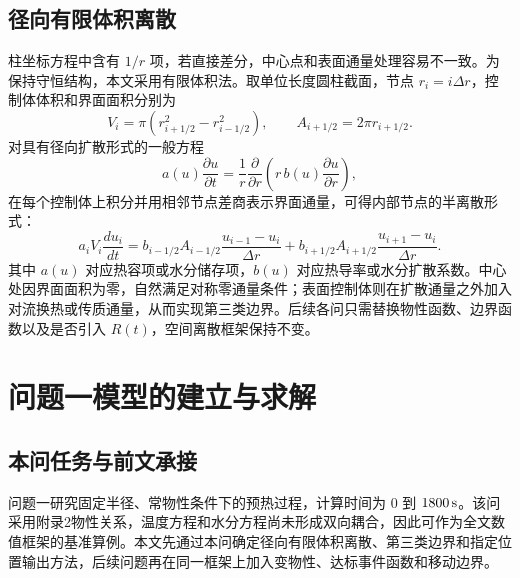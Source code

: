\documentclass[UTF8,a4paper,12pt]{ctexart}
\begin{document}
\subsection{径向有限体积离散}
柱坐标方程中含有 $1/r$ 项，若直接差分，中心点和表面通量处理容易不一致。为保持守恒结构，本文采用有限体积法。取单位长度圆柱截面，节点 $r_i=i\Delta r$，控制体体积和界面面积分别为
\begin{equation}
  V_i=\pi\left(r_{i+1/2}^2-r_{i-1/2}^2\right),\qquad
  A_{i+1/2}=2\pi r_{i+1/2}.
\end{equation}
对具有径向扩散形式的一般方程
\begin{equation}
  a(u)\frac{\partial u}{\partial t}
  =\frac1r\frac{\partial}{\partial r}\left(r\,b(u)\frac{\partial u}{\partial r}\right),
\end{equation}
在每个控制体上积分并用相邻节点差商表示界面通量，可得内部节点的半离散形式：
\begin{equation}
  a_iV_i\frac{du_i}{dt}
  =b_{i-1/2}A_{i-1/2}\frac{u_{i-1}-u_i}{\Delta r}
  +b_{i+1/2}A_{i+1/2}\frac{u_{i+1}-u_i}{\Delta r}.
\end{equation}
其中 $a(u)$ 对应热容项或水分储存项，$b(u)$ 对应热导率或水分扩散系数。中心处因界面面积为零，自然满足对称零通量条件；表面控制体则在扩散通量之外加入对流换热或传质通量，从而实现第三类边界。后续各问只需替换物性函数、边界函数以及是否引入 $R(t)$，空间离散框架保持不变。

\section{问题一模型的建立与求解}
\subsection{本问任务与前文承接}
问题一研究固定半径、常物性条件下的预热过程，计算时间为 $0$ 到 $1800\rm\,s$。该问采用附录2物性关系，温度方程和水分方程尚未形成双向耦合，因此可作为全文数值框架的基准算例。本文先通过本问确定径向有限体积离散、第三类边界和指定位置输出方法，后续问题再在同一框架上加入变物性、达标事件函数和移动边界。
\end{document}
